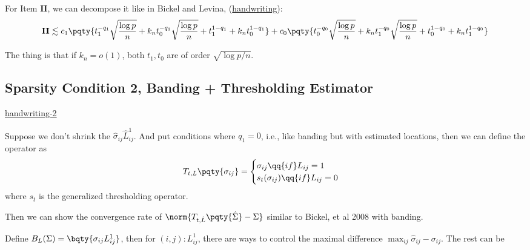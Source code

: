 \documentclass[12pt]{article}
\newcommand{\itm}[1]{\mathbf{#1}}
\begin{document}
        For Item \(\itm{II}\), we can decompose it like in Bickel and Levina, (\href{https://github.com/lwg342/cov-est-dev/blob/dev/hw-2021-05-26.pdf}{handwriting}):
        \begin{equation*}
            \itm{II} \lesssim c_{1} \pqty{t_{1}^{-q_{1}} \sqrt{\frac{\log p}{n}} + k_{n} t_{0}^{-q_{1}}\sqrt{\frac{\log p}{n}} + t_{1}^{1-q_{1}} + k_{n} t_{0} ^{1- q_{1}}} + c_{0} \pqty{t_{0}^{-q_{0}} \sqrt{\frac{\log p}{n}} + k_{n} t_{1}^{-q_{0}} \sqrt{\frac{\log p}{n}} + t_{0} ^{1-q_{0}} + k_{n} t_{1}^{1-q_{0}}}
        \end{equation*} 

        The thing is that if \(k_{n} = o(1)\), both \(t_{1}, t_{0}\) are of order \(\sqrt{\log p / n}\). 

    \subsection{Sparsity Condition 2, Banding + Thresholding Estimator}
        \href{https://github.com/lwg342/cov-est-dev/blob/dev/hw-2021-05-27.pdf}{handwriting-2}

        Suppose we don't shrink the \(\hat{\sigma}_{ij}\hat{L}_{ij}^{1}\). And put conditions where \(q_{1} = 0\), i.e., like banding but with estimated locations, then we can define the operator  as 
        \begin{equation*}
            T_{t, L}\pqty{\sigma_{ij}} = \begin{cases}
                \sigma_{ij} \qq{if} L_{ij} = 1  \\
                s_{t}(\sigma_{ij}) \qq{if} L_{ij} = 0 
            \end{cases}
        \end{equation*}
        where \(s_{t}\) is the generalized thresholding operator. 

        Then we can show the convergence rate of \(\norm{T_{t,\hat{L}} \pqty{\hat{\Sigma}} - \Sigma}\) similar to Bickel, et al 2008 with banding.
        
        Define \(B_{L}(\Sigma) = \bqty{\sigma_{ij}L_{ij}^{1}}\), then for \((i,j): L_{ij}^{1}\), there are ways to control the maximal difference \(\max_{ij} \hat{\sigma}_{ij} - \sigma_{ij}\). The rest can be 
        

        
        

        

\end{document}
